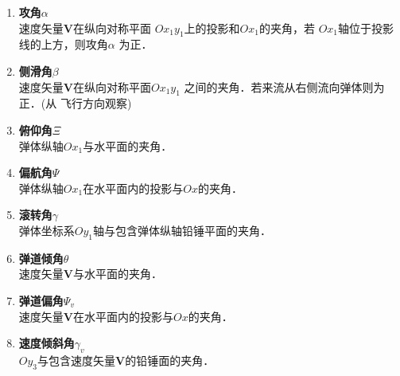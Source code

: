 \begin{notice}
	\begin{enumerate}
		\item {\bfseries 攻角}$\alpha$ \\
		      速度矢量$\mathbf{V}$在纵向对称平面
		      $Ox_1y_1$上的投影和$Ox_1$的夹角，若
		      $Ox_1$轴位于投影线的上方，则攻角$\alpha$
		      为正．
		\item {\bfseries 侧滑角}$\beta$ \\
		      速度矢量$\mathbf{V}$在纵向对称平面$Ox_1y_1$
		      之间的夹角．若来流从右侧流向弹体则为正．(从
		      飞行方向观察)
        \item {\bfseries 俯仰角}$\Xi$\\ 
          弹体纵轴$Ox_1$与水平面的夹角．
        \item {\bfseries 偏航角}$\Psi$\\ 
          弹体纵轴$Ox_1$在水平面内的投影与$Ox$的夹角．
        \item {\bfseries 滚转角}$\gamma$\\ 
          弹体坐标系$Oy_1$轴与包含弹体纵轴铅锤平面的夹角．
        \item {\bfseries 弹道倾角}$\theta$\\ 
          速度矢量$\mathbf{V}$与水平面的夹角．
        \item {\bfseries 弹道偏角}$\Psi_v$\\ 
          速度矢量$\mathbf{V}$在水平面内的投影与$Ox$的夹角．
        \item {\bfseries 速度倾斜角}$\gamma_v$\\ 
          $Oy_3$与包含速度矢量$\mathbf{V}$的铅锤面的夹角．
	\end{enumerate}
	
\end{notice}
